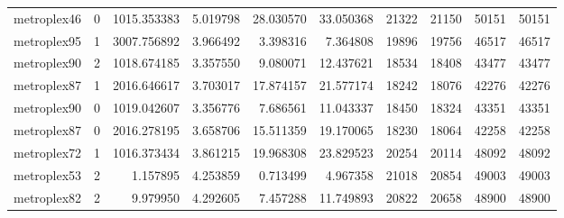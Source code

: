 \begin{longtable}{|l|r|r|r|r|r|r|r|r|r|}
metroplex46 & 0 & 1015.353383 & 5.019798 & 28.030570 & 33.050368 & 21322 & 21150 & 50151 & 50151 \\
metroplex95 & 1 & 3007.756892 & 3.966492 & 3.398316 & 7.364808 & 19896 & 19756 & 46517 & 46517 \\
metroplex90 & 2 & 1018.674185 & 3.357550 & 9.080071 & 12.437621 & 18534 & 18408 & 43477 & 43477 \\
metroplex87 & 1 & 2016.646617 & 3.703017 & 17.874157 & 21.577174 & 18242 & 18076 & 42276 & 42276 \\
metroplex90 & 0 & 1019.042607 & 3.356776 & 7.686561 & 11.043337 & 18450 & 18324 & 43351 & 43351 \\
metroplex87 & 0 & 2016.278195 & 3.658706 & 15.511359 & 19.170065 & 18230 & 18064 & 42258 & 42258 \\
metroplex72 & 1 & 1016.373434 & 3.861215 & 19.968308 & 23.829523 & 20254 & 20114 & 48092 & 48092 \\
metroplex53 & 2 & 1.157895 & 4.253859 & 0.713499 & 4.967358 & 21018 & 20854 & 49003 & 49003 \\
metroplex82 & 2 & 9.979950 & 4.292605 & 7.457288 & 11.749893 & 20822 & 20658 & 48900 & 48900 \\
\end{longtable}
